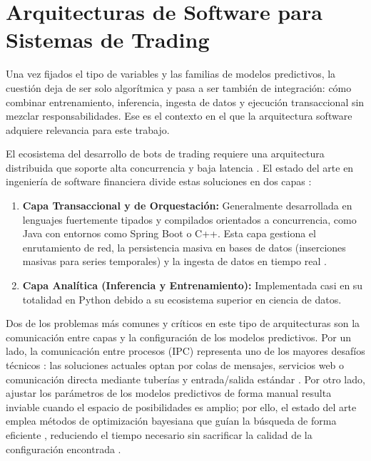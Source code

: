 \section{Arquitecturas de Software para Sistemas de Trading}

Una vez fijados el tipo de variables y las familias de modelos predictivos, la cuestión deja de ser solo algorítmica y pasa a ser también de integración: cómo combinar entrenamiento, inferencia, ingesta de datos y ejecución transaccional sin mezclar responsabilidades. Ese es el contexto en el que la arquitectura software adquiere relevancia para este trabajo.

El ecosistema del desarrollo de bots de trading requiere una arquitectura distribuida que soporte alta concurrencia y baja latencia \parencite{treleaven_algorithmic_2013}. El estado del arte en ingeniería de software financiera divide estas soluciones en dos capas \parencite{richards_software_2022}:

\begin{enumerate}
    \item \textbf{Capa Transaccional y de Orquestación:} Generalmente desarrollada en lenguajes fuertemente tipados y compilados orientados a concurrencia, como Java con entornos como Spring Boot \parencite{pivotal_springboot_2024} o C++. Esta capa gestiona el enrutamiento de red, la persistencia masiva en bases de datos (inserciones masivas para series temporales) \parencite{kimball_data_2004} y la ingesta de datos en tiempo real \parencite{richards_software_2022}.

    \item \textbf{Capa Analítica (Inferencia y Entrenamiento):} Implementada casi en su totalidad en Python \parencite{hilpisch_python_2018} debido a su ecosistema superior en ciencia de datos.
\end{enumerate}

Dos de los problemas más comunes y críticos en este tipo de arquitecturas son la comunicación entre capas y la configuración de los modelos predictivos. Por un lado, la comunicación entre procesos (IPC) representa uno de los mayores desafíos técnicos \parencite{furuhashi_msgpack_2013}: las soluciones actuales optan por colas de mensajes, servicios web o comunicación directa mediante tuberías y entrada/salida estándar \parencite{treleaven_algorithmic_2013,newman_building_2015,kleppmann_designing_2017}. Por otro lado, ajustar los parámetros de los modelos predictivos de forma manual resulta inviable cuando el espacio de posibilidades es amplio; por ello, el estado del arte emplea métodos de optimización bayesiana que guían la búsqueda de forma eficiente \parencite{lopez_de_prado_advances_2018}, reduciendo el tiempo necesario sin sacrificar la calidad de la configuración encontrada \parencite{feurer_hyperparameter_2019}.


